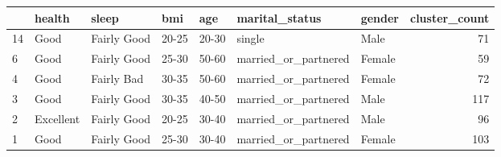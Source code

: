 \begin{tabular}{lllllllr}
\toprule
{} &     health &        sleep &    bmi &    age &        marital\_status &  gender &  cluster\_count \\
\midrule
14 &       Good &  Fairly Good &  20-25 &  20-30 &                single &    Male &             71 \\
6  &       Good &  Fairly Good &  25-30 &  50-60 &  married\_or\_partnered &  Female &             59 \\
4  &       Good &   Fairly Bad &  30-35 &  50-60 &  married\_or\_partnered &  Female &             72 \\
3  &       Good &  Fairly Good &  30-35 &  40-50 &  married\_or\_partnered &    Male &            117 \\
2  &  Excellent &  Fairly Good &  20-25 &  30-40 &  married\_or\_partnered &    Male &             96 \\
1  &       Good &  Fairly Good &  25-30 &  30-40 &  married\_or\_partnered &  Female &            103 \\
\bottomrule
\end{tabular}
